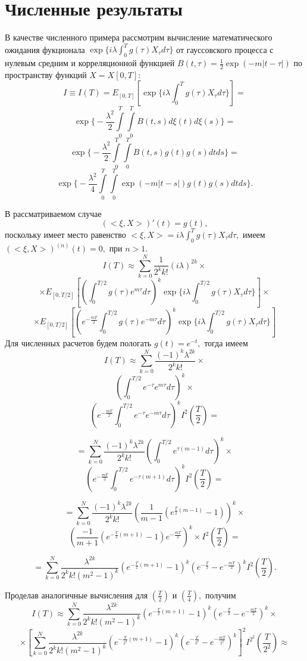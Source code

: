 \documentclass [12pt]{report}
\begin{document}
\chapter{Численные результаты}

В качестве численного примера рассмотрим вычисление математического ожидания фукционала $ \exp\{i\lambda\int_{0}^{T}g(\tau)X_\tau d\tau\} $ от гауссовского процесса с нулевым средним и корреляционной функцией
$B(t,\tau) = \frac{1}{2}\exp(-m|t-\tau|)$
по пространству функций $X=X[0, T]:$
$$
I\equiv I(T) =
E_{[0,T]}[\exp\{i\lambda\int_{0}^{T}g(\tau)X_\tau d\tau\}] =
$$
$$
\exp\Big\{-\frac{\lambda^2}{2}\int\limits_0^T\int\limits_0^T
B(t,s)d\xi(t)d\xi(s)\Big\} =
$$
$$
\exp\Big\{-\frac{\lambda^2}{2}\int\limits_0^T\int\limits_0^T
B(t,s)g(t)g(s)dtds\Big\} =
$$
$$
\exp\Big\{-\frac{\lambda^2}{4}\int\limits_0^T\int\limits_0^T
\exp(-m|t-s|)g(t)g(s)dtds\Big\}.
$$

В рассматриваемом случае
$$
(<\xi,X>)'(t)= g(t),
$$
поскольку имеет место равенство
$<\xi, X> = i\lambda\int_{0}^{T}g(\tau)X_\tau d\tau , $
имеем $ (<\xi,X>)^{(n)}(t)= 0,$ при $ n > 1. $
$$
I(T)\approx \sum_{k=0}^{N}\frac{1}{2^k k!}(i\lambda)^{2k}\times
$$
$$
\times E_{[0,T/2]}[(\int_{0}^{T/2}g(\tau)e^{m\tau}d\tau)^k
\exp\{i\lambda\int_{0}^{T/2}g(\tau)X_\tau d\tau\}]\times
$$
$$
\times E_{[0,T/2]}[(e^{-\frac{mT}{2}}\int_{0}^{T/2}g(\tau)e^{-m\tau}d\tau)^k
\exp\{i\lambda\int_{0}^{T/2}g(\tau)X_\tau d\tau\}]
$$
Для численных расчетов будем пологать $g(t) = e^{-t},$ тогда имеем
$$
I(T)\approx \sum_{k=0}^{N} \frac{(-1)^k\lambda^{2k}} {2^k k!} \times
$$
$$
(\int_{0}^{T/2}e^{-\tau}e^{m\tau}d\tau)^k \times
$$
$$
(e^{-\frac{mT}{2}}\int_{0}^{T/2}e^{-\tau}e^{-m\tau}d\tau)^k
I^2(\frac{T}{2})=
$$

$$
= \sum_{k=0}^{N} \frac{(-1)^k\lambda^{2k}} {2^k k!}
(\int_{0}^{T/2}e^{\tau(m-1)}d\tau)^k \times
$$
$$
(e^{-\frac{mT}{2}}\int_{0}^{T/2}e^{-\tau(m+1)}d\tau)^k
I^2(\frac{T}{2}) =
$$

$$
= \sum_{k=0}^{N} \frac{(-1)^k\lambda^{2k}} {2^k k!}
(\frac{1}{m-1}(e^{\frac{T}{2}(m-1)} - 1))^k \times
$$
$$
(\frac{-1}{m+1}(e^{-\frac{T}{2}(m+1)} - 1) e^{-\frac{mT}{2}})^k
\times I^2(\frac{T}{2}) =
$$

$$
= \sum_{k=0}^{N} \frac{\lambda^{2k}} {2^k k! (m^2 - 1)^k}
(e^{-\frac{T}{2}(m+1)} - 1)^k (e^{-\frac{T}{2}} - e^{-\frac{mT}{2}})^k
I^2(\frac{T}{2}).
$$

Проделав аналогичные вычисления для $(\frac{T}{2})$
и $(\frac{T}{4}),$ получим
$$
I(T)\approx \sum_{k=0}^{N} \frac{\lambda^{2k}} {2^k k! (m^2 - 1)^k}
(e^{-\frac{T}{2}(m+1)} - 1)^k (e^{-\frac{T}{2}} - e^{-\frac{mT}{2}})^k \times
$$
$$
\times[ \sum_{k=0}^{N} \frac{\lambda^{2k}} {2^k k! (m^2 - 1)^k}
(e^{-\frac{T}{2^2}(m+1)} - 1)^k (e^{-\frac{T}{2^2}} - e^{-\frac{mT}{2^2}})^k
]^2 I^{2^2}(\frac{T}{2^2}) \approx
$$
\end{document}
